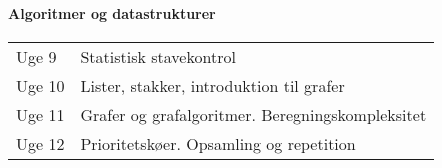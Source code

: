 \documentclass[12pt]{article}
\begin{document}
\paragraph{Algoritmer og datastrukturer}
\begin{center}\begin{tabular}{p{4em}p{30em}}
Uge 9& Statistisk stavekontrol\\
Uge 10& Lister, stakker, introduktion til grafer\\
Uge 11& Grafer og grafalgoritmer. Beregningskompleksitet\\
Uge 12& Prioritetskøer. Opsamling og repetition\\
\end{tabular}\end{center}
\end{document}
